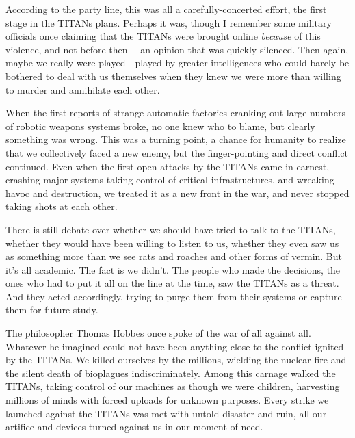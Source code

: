 According to the party line, this was all a carefully-concerted
effort, the first stage in the TITANs plans.
Perhaps it was, though I remember some military officials
once claiming that the TITANs were brought
online \textit{because} of this violence, and not before then—
an opinion that was quickly silenced. Then again, 
maybe we really were played—played by greater intelligences
who could barely be bothered to deal with
us themselves when they knew we were more than 
willing to murder and annihilate each other.

When the first reports of strange automatic factories
cranking out large numbers of robotic weapons
systems broke, no one knew who to blame, but clearly 
something was wrong. This was a turning point, a 
chance for humanity to realize that we collectively 
faced a new enemy, but the finger-pointing and direct 
conflict continued. Even when the first open attacks 
by the TITANs came in earnest, crashing major systems
taking control of critical infrastructures, and
wreaking havoc and destruction, we treated it as a 
new front in the war, and never stopped taking shots 
at each other.

There is still debate over whether we should have 
tried to talk to the TITANs, whether they would have 
been willing to listen to us, whether they even saw us 
as something more than we see rats and roaches and 
other forms of vermin. But it's all academic. The fact 
is we didn't. The people who made the decisions, the 
ones who had to put it all on the line at the time, saw 
the TITANs as a threat. And they acted accordingly, 
trying to purge them from their systems or capture 
them for future study.

The philosopher Thomas Hobbes once spoke of the 
war of all against all. Whatever he imagined could not 
have been anything close to the conflict ignited by the 
TITANs. We killed ourselves by the millions, wielding
the nuclear fire and the silent death of bioplagues
indiscriminately. Among this carnage walked the 
TITANs, taking control of our machines as though 
we were children, harvesting millions of minds with 
forced uploads for unknown purposes. Every strike 
we launched against the TITANs was met with untold 
disaster and ruin, all our artifice and devices turned 
against us in our moment of need.

